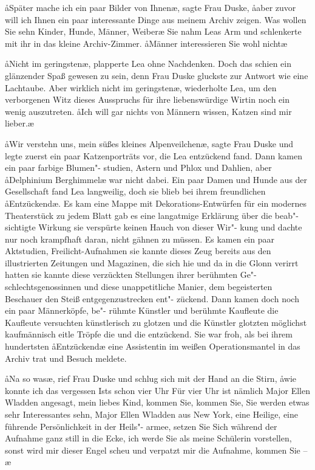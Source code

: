 \aa{}Später mache ich ein paar Bilder von Ihnen\ae{}, sagte Frau
Duske, \aa{}aber zuvor will ich Ihnen ein paar interessante
Dinge aus meinem Archiv zeigen. Was wollen Sie sehn\frag{}
Kinder, Hunde, Männer, Weiber\frag{}\ae{} Sie nahm Leas Arm
und schlenkerte mit ihr in das kleine Archiv-Zimmer. \aa{}Männer
interessieren Sie wohl nicht\frag{}\ae{}

\aa{}Nicht im geringsten\ae{}, plapperte Lea ohne Nachdenken. Doch
das schien ein glänzender Spaß gewesen zu sein, denn Frau
Duske gluckste zur Antwort wie eine Lachtaube. \aanah{}Aber wirklich
nicht im geringsten\ae{}, wiederholte Lea, um den verborgenen
Witz dieses Ausspruchs für ihre liebenswürdige Wirtin noch
ein wenig auszutreten. \aa{}Ich will gar nichts von Männern
wissen, Katzen sind mir lieber.\ae{}

\aa{}Wir verstehn uns, mein süßes kleines Alpenveilchen\ae{}, sagte
Frau Duske und legte zuerst ein paar Katzenporträts vor, die
Lea entzückend fand. Dann kamen ein paar farbige Blumen"-%
studien, Astern und Phlox und Dahlien, aber \aa{}Delphinium
Berghimmel\ae{} war nicht dabei. Ein paar Damen und Hunde
aus der Gesellschaft fand Lea langweilig, doch sie blieb bei
ihrem freundlichen \aa{}Entzückend\ae{}. Es kam eine Mappe mit
Dekorations-Entwürfen für ein modernes Theaterstück\semi{} zu
jedem Blatt gab es eine langatmige Erklärung über die beab"-%
sichtigte Wirkung\semi{} sie verspürte keinen Hauch von dieser Wir"-%
kung und dachte nur noch krampfhaft daran, nicht gähnen zu
müssen. Es kamen ein paar Aktstudien, Freilicht-Aufnahmen\semi{}
sie kannte dieses Zeug bereits aus den illustrierten Zeitungen
und Magazinen, die sich hie und da in die Glonn verirrt hatten\semi{}
sie kannte diese verzückten Stellungen ihrer berühmten Ge"-%
schlechtsgenossinnen und diese unappetitliche Manier, dem
begeisterten Beschauer den Steiß entgegenzustrecken\dopp{} ent"-%
zückend. Dann kamen doch noch ein paar Männerköpfe, be"-%
rühmte Künstler und berühmte Kaufleute\semi{} die Kaufleute
versuchten künstlerisch zu glotzen und die Künstler glotzten
möglichst kaufmännisch\semi{} eitle Tröpfe die und die\dopp{} entzückend.
Sie war froh, als bei ihrem hundertsten \aa{}Entzückend\ae{} eine
Assistentin im weißen Operationsmantel in das Archiv trat
und Besuch meldete.

\aa{}Na so was\ae{}, rief Frau Duske und schlug sich mit der Hand an
die Stirn, \aa{}wie konnte ich das vergessen\ausr{} Ists schon vier Uhr\frag{}
Für vier Uhr ist nämlich Major Ellen Wladden angesagt,
mein liebes Kind, kommen Sie, kommen Sie, Sie werden
etwas sehr Interessantes sehn, Major Ellen Wladden aus New
York, eine Heilige, eine führende Persönlichkeit in der Heils"-%
armee, setzen Sie Sich\eingriff{eS62-1}{Sich ] sich} während der Aufnahme ganz still in die
Ecke, ich werde Sie als meine Schülerin vorstellen, sonst
wird mir dieser Engel scheu und verpatzt mir die Aufnahme,
kommen Sie --\ae{}

